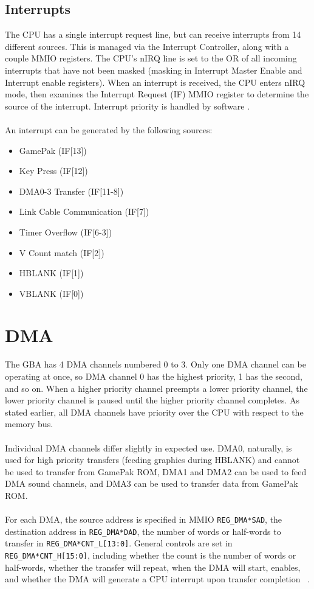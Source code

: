 \documentclass[11pt,a4paper,draft]{article}
\begin{document}
	\subsection{Interrupts}
	The CPU has a single interrupt request line, but can receive interrupts from 14 different sources. This is managed via the Interrupt Controller, along with a couple MMIO registers. The CPU's nIRQ line is set to the OR of all incoming interrupts that have not been masked (masking in Interrupt Master Enable and Interrupt enable registers). When an interrupt is received, the CPU enters nIRQ mode, then examines the Interrupt Request (IF) MMIO register to determine the source of the interrupt. Interrupt priority is handled by software \cite{GBAManual}.\\\\
	An interrupt can be generated by the following sources:
	\begin{multicols}{3}
	\begin{itemize}
		\item GamePak (IF[13]) %
		\item Key Press (IF[12])
		\item DMA{0-3} Transfer (IF[11-8])
		\item Link Cable Communication (IF[7])
		\item Timer Overflow (IF[6-3])
		\item V Count match (IF[2])
		\item HBLANK (IF[1])
		\item VBLANK (IF[0])
	\end{itemize} 
	\end{multicols}
	
	\section{DMA}
	The GBA has 4 DMA channels numbered 0 to 3. Only one DMA channel can be operating at once, so DMA channel 0 has the highest priority, 1 has the second, and so on. When a higher priority channel preempts a lower priority channel, the lower priority channel is paused until the higher priority channel completes. As stated earlier, all DMA channels have priority over the CPU with respect to the memory bus.\\\\
	Individual DMA channels differ slightly in expected use. DMA0, naturally, is used for high priority transfers (feeding graphics during HBLANK) and cannot be used to transfer from GamePak ROM, DMA1 and DMA2 can be used to feed DMA sound channels, and DMA3 can be used to transfer data from GamePak ROM.\\\\
	For each DMA, the source address is specified in MMIO \texttt{REG\_DMA*SAD}, the destination address in \texttt{REG\_DMA*DAD}, the number of words or half-words to transfer in \texttt{REG\_DMA*CNT\_L[13:0]}.
	General controls are set in \texttt{REG\_DMA*CNT\_H[15:0]}, including whether the count is the number of words or half-words, whether the transfer will repeat, when the DMA will start, enables, and whether the DMA will generate a CPU interrupt upon transfer completion ~\cite{GBAManual}.
	
\end{document}
